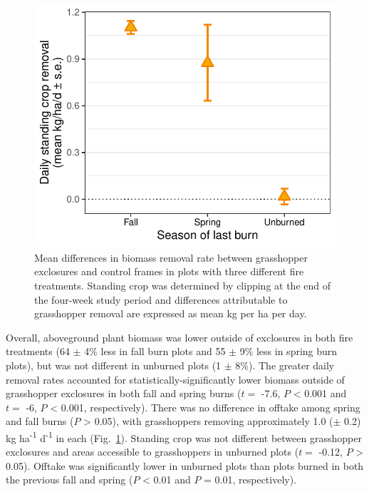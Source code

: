 \documentclass[referee, 
	            sn-basic]
           {sn-jnl}
\begin{document}
\begin{linenumbers}
\begin{figure}
\centering
\includegraphics{removal_gg-1.pdf}
\caption{Mean differences in biomass removal rate between grasshopper exclosures and control frames in plots with three different fire treatments. 
Standing crop was determined by clipping at the end of the four-week study period and differences attributable to grasshopper removal are expressed as mean kg per ha per day.}
\label{removal} %
\end{figure}

Overall, aboveground plant biomass was lower outside of exclosures in both fire treatments (64 $\pm$ 4\% less in fall burn plots and 55 $\pm$ 9\% less in spring burn plots), but was not different in unburned plots (1 $\pm$ 8\%).
The greater daily removal rates accounted for statistically-significantly lower biomass outside of grasshopper exclosures in both fall and spring burns (\(t =\) -7.6,
\(P\) \textless{} 0.001 and \(t =\) -6, \(P\) \textless{} 0.001, respectively). 
There was no difference in offtake among spring and fall burns (\(P\) \textgreater{} 0.05), with grasshoppers removing approximately 1.0 ($\pm$ 0.2) kg ha\textsuperscript{-1} d\textsuperscript{-1} in each (Fig.~\ref{removal}). 
Standing crop was not different between grasshopper exclosures and areas accessible to grasshoppers in unburned plots (\(t =\) -0.12, \(P\) \textgreater{} 0.05).
 Offtake was significantly lower in unburned plots than plots burned in both the previous fall and spring (\(P\) \textless{} 0.01 and \(P\) = 0.01, respectively).


\end{linenumbers}
\end{document}
